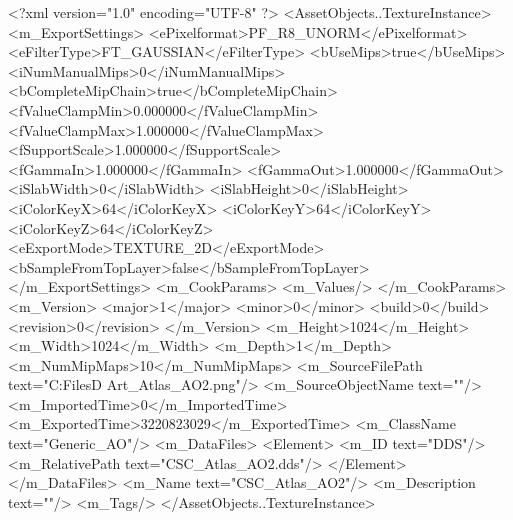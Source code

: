 <?xml version="1.0" encoding="UTF-8" ?>
<AssetObjects..TextureInstance>
	<m_ExportSettings>
		<ePixelformat>PF_R8_UNORM</ePixelformat>
		<eFilterType>FT_GAUSSIAN</eFilterType>
		<bUseMips>true</bUseMips>
		<iNumManualMips>0</iNumManualMips>
		<bCompleteMipChain>true</bCompleteMipChain>
		<fValueClampMin>0.000000</fValueClampMin>
		<fValueClampMax>1.000000</fValueClampMax>
		<fSupportScale>1.000000</fSupportScale>
		<fGammaIn>1.000000</fGammaIn>
		<fGammaOut>1.000000</fGammaOut>
		<iSlabWidth>0</iSlabWidth>
		<iSlabHeight>0</iSlabHeight>
		<iColorKeyX>64</iColorKeyX>
		<iColorKeyY>64</iColorKeyY>
		<iColorKeyZ>64</iColorKeyZ>
		<eExportMode>TEXTURE_2D</eExportMode>
		<bSampleFromTopLayer>false</bSampleFromTopLayer>
	</m_ExportSettings>
	<m_CookParams>
		<m_Values/>
	</m_CookParams>
	<m_Version>
		<major>1</major>
		<minor>0</minor>
		<build>0</build>
		<revision>0</revision>
	</m_Version>
	<m_Height>1024</m_Height>
	<m_Width>1024</m_Width>
	<m_Depth>1</m_Depth>
	<m_NumMipMaps>10</m_NumMipMaps>
	<m_SourceFilePath text="C:\Users\Shadow\Desktop\Working Files\3D Art\Textures\CSC_Atlas_AO2.png"/>
	<m_SourceObjectName text=""/>
	<m_ImportedTime>0</m_ImportedTime>
	<m_ExportedTime>3220823029</m_ExportedTime>
	<m_ClassName text="Generic_AO"/>
	<m_DataFiles>
		<Element>
			<m_ID text="DDS"/>
			<m_RelativePath text="CSC_Atlas_AO2.dds"/>
		</Element>
	</m_DataFiles>
	<m_Name text="CSC_Atlas_AO2"/>
	<m_Description text=""/>
	<m_Tags/>
</AssetObjects..TextureInstance>

